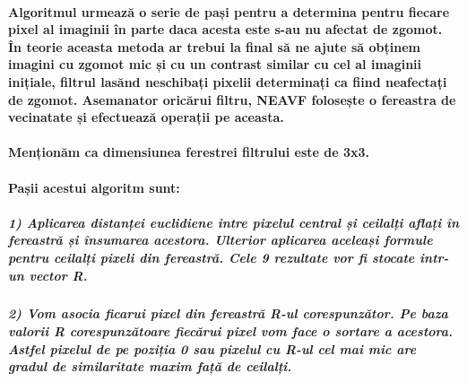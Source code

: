 \documentclass[11pt]{article}
\begin{document}
\paragraph{Algoritmul urmează o serie de pași pentru a determina pentru
fiecare pixel al imaginii în parte daca acesta este s-au nu afectat de
zgomot. În teorie aceasta metoda ar trebui la final să ne ajute să
obținem imagini cu zgomot mic și cu un contrast similar cu cel al
imaginii inițiale, filtrul lasănd neschibați pixelii determinați ca
fiind neafectați de zgomot. Asemanator oricărui filtru, NEAVF folosește
o fereastra de vecinatate și efectuează operații pe
aceasta.}\label{algoritmul-urmeazux103-o-serie-de-paux219i-pentru-a-determina-pentru-fiecare-pixel-al-imaginii-uxeen-parte-daca-acesta-este-s-au-nu-afectat-de-zgomot.-uxeen-teorie-aceasta-metoda-ar-trebui-la-final-sux103-ne-ajute-sux103-obux21binem-imagini-cu-zgomot-mic-ux219i-cu-un-contrast-similar-cu-cel-al-imaginii-iniux21biale-filtrul-lasux103nd-neschibaux21bi-pixelii-determinaux21bi-ca-fiind-neafectaux21bi-de-zgomot.-asemanator-oricux103rui-filtru-neavf-foloseux219te-o-fereastra-de-vecinatate-ux219i-efectueazux103-operaux21bii-pe-aceasta.}

\paragraph{Menționăm ca dimensiunea ferestrei filtrului este de
3x3.}\label{menux21bionux103m-ca-dimensiunea-ferestrei-filtrului-este-de-3x3.}

\paragraph{Pașii acestui algoritm
sunt:}\label{paux219ii-acestui-algoritm-sunt}

\subparagraph{1) Aplicarea distanței euclidiene intre pixelul central și
ceilalți aflați în fereastră și însumarea acestora. Ulterior aplicarea
aceleași formule pentru ceilalți pixeli din fereastră. Cele 9 rezultate
vor fi stocate intr-un vector
R.}\label{aplicarea-distanux21bei-euclidiene-intre-pixelul-central-ux219i-ceilalux21bi-aflaux21bi-uxeen-fereastrux103-ux219i-uxeensumarea-acestora.-ulterior-aplicarea-aceleaux219i-formule-pentru-ceilalux21bi-pixeli-din-fereastrux103.-cele-9-rezultate-vor-fi-stocate-intr-un-vector-r.}

    \subparagraph{2) Vom asocia ficarui pixel din fereastră R-ul
corespunzător. Pe baza valorii R corespunzătoare fiecărui pixel vom face
o sortare a acestora. Astfel pixelul de pe poziția 0 sau pixelul cu R-ul
cel mai mic are gradul de similaritate maxim față de
ceilalți.}\label{vom-asocia-ficarui-pixel-din-fereastrux103-r-ul-corespunzux103tor.-pe-baza-valorii-r-corespunzux103toare-fiecux103rui-pixel-vom-face-o-sortare-a-acestora.-astfel-pixelul-de-pe-poziux21bia-0-sau-pixelul-cu-r-ul-cel-mai-mic-are-gradul-de-similaritate-maxim-faux21bux103-de-ceilalux21bi.}
\end{document}
